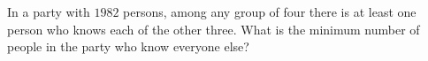 In a party with $1982$ persons, among any group of four there is at least one person who knows each of the other three. What is the minimum number of people in the party who know everyone else?
